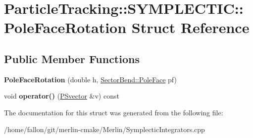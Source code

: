 \hypertarget{structParticleTracking_1_1SYMPLECTIC_1_1PoleFaceRotation}{}\section{Particle\+Tracking\+:\+:S\+Y\+M\+P\+L\+E\+C\+T\+IC\+:\+:Pole\+Face\+Rotation Struct Reference}
\label{structParticleTracking_1_1SYMPLECTIC_1_1PoleFaceRotation}
\subsection*{Public Member Functions}
\begin{DoxyCompactItemize}
\item 
\mbox{\label{structParticleTracking_1_1SYMPLECTIC_1_1PoleFaceRotation_a93a3b4619867c6dcfd812ab1fee68062}} 
{\bfseries Pole\+Face\+Rotation} (double h, \hyperlink{classSectorBend_1_1PoleFace}{Sector\+Bend\+::\+Pole\+Face} pf)
\item 
\mbox{\label{structParticleTracking_1_1SYMPLECTIC_1_1PoleFaceRotation_abb18dc42d99e0af1e9e0b1093a532a39}} 
void {\bfseries operator()} (\hyperlink{classPSvector}{P\+Svector} \&v) const
\end{DoxyCompactItemize}


The documentation for this struct was generated from the following file\+:\begin{DoxyCompactItemize}
\item 
/home/fallon/git/merlin-\/cmake/\+Merlin/Symplectic\+Integrators.\+cpp\end{DoxyCompactItemize}

